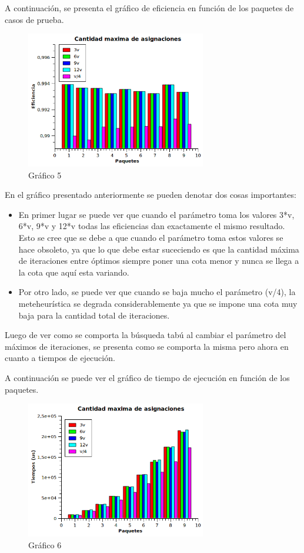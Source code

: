 \documentclass[a4paper,10pt]{article}
\begin{document}
A continuaci\'on, se presenta el gr\'afico de eficiencia en funci\'on de los paquetes de casos de prueba.

\begin{figure}[H]
\centering
\includegraphics[width=0.7\textwidth]{graficos/combo4.png} 
\caption{Gráfico 5}
\end{figure}


En el gr\'afico presentado anteriormente se pueden denotar dos cosas importantes:
\begin{itemize}
\item En primer lugar se puede ver que cuando el par\'ametro toma los valores 3*v, 6*v, 9*v y 12*v todas las eficiencias dan exactamente el mismo resultado. Esto se cree que se debe a que cuando el par\'ametro toma estos valores se hace obsoleto, ya que lo que debe estar suceciendo es que la cantidad m\'axima de iteraciones entre \'optimos siempre poner una cota menor y nunca se llega a la cota que aqu\'i esta variando. 
\item Por otro lado, se puede ver que cuando se baja mucho el par\'ametro (v/4), la meteheur\'istica se degrada considerablemente ya que se impone una cota muy baja para la cantidad total de iteraciones.
\end{itemize}


Luego de ver como se comporta la b\'usqueda tab\'u al cambiar el par\'ametro del m\'aximos de iteraciones, se presenta como se comporta la misma pero ahora en cuanto a tiempos de ejecuci\'on.

A continuaci\'on se puede ver el gr\'afico de tiempo de ejecuci\'on en funci\'on de los paquetes.

\begin{figure}[H]
\centering
\includegraphics[width=0.7\textwidth]{graficos/combo4Tiempos.png} 
\caption{Gráfico 6}
\end{figure}
\end{document}
